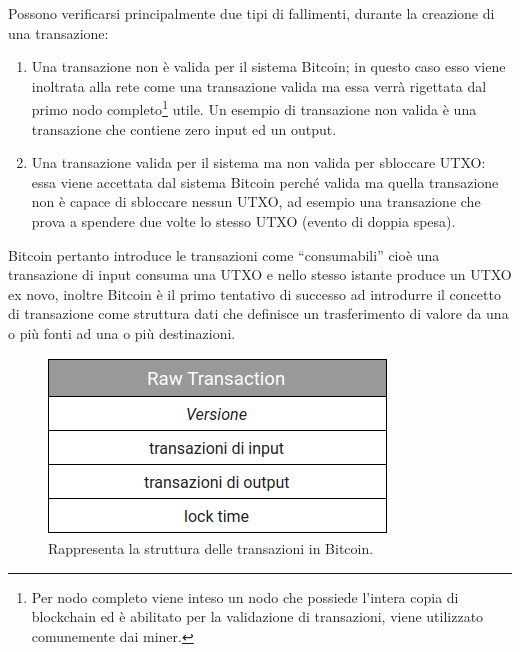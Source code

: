 Possono verificarsi principalmente due tipi di fallimenti, durante la creazione di una transazione:
\begin{enumerate}
  \item Una transazione non è valida per il sistema Bitcoin; in questo caso esso viene inoltrata alla rete come una transazione valida ma essa verrà rigettata dal primo nodo completo\footnote{Per nodo completo viene inteso un nodo che possiede l’intera copia di blockchain ed è abilitato per la validazione di transazioni, viene utilizzato comunemente dai miner.} utile. Un esempio di transazione non valida è una transazione che contiene zero input ed un output.
  \item Una transazione valida per il sistema ma non valida per sbloccare UTXO: essa viene accettata dal sistema Bitcoin perché valida ma quella transazione non è capace di sbloccare nessun UTXO, ad esempio una transazione che prova a spendere due volte lo stesso UTXO (evento di doppia spesa).
\end{enumerate}

Bitcoin pertanto introduce le transazioni come “consumabili” cioè una transazione di input consuma una UTXO e nello stesso istante produce un UTXO ex novo, inoltre Bitcoin è il primo tentativo di successo ad introdurre il concetto di transazione come struttura dati che definisce un trasferimento di valore da una o più fonti ad una o più destinazioni.
\begin{figure}[H]
\begin{center}
\includegraphics[width=0.6\columnwidth]{images/raw-transaction-bitcoin.png}
\end{center}
\caption{Rappresenta la struttura delle transazioni in Bitcoin.}
\label{fig:rawtransactionbitcoin}
\end{figure}

